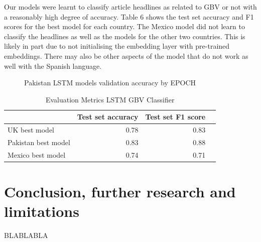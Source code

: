 \documentclass{article}
\begin{document}
{{Our models were learnt to classify article headlines as related to GBV or not with a reasonably high degree of accuracy. Table 6 shows the test set accuracy and F1 scores for the best model for each country. The Mexico model did not learn to classify the headlines as well as the models for the other two countries. This is likely in part due to not initialising the embedding layer with pre-trained embeddings. There may also be other aspects of the model that do not work as well with the Spanish language.


\begin{figure}[H]
	\caption{\label{fig:my-label1} Pakistan LSTM models validation accuracy by EPOCH}
\end{figure}

}
\begin{table}[!htp]\centering
	\caption{Evaluation Metrics LSTM GBV Classifier}\label{tab: }
	\scriptsize
	\begin{tabular}{lrrr}\toprule
		&Test set accuracy &Test set F1 score \\\midrule
		UK best model &0.78 &0.83 \\
		Pakistan best model &0.83 &0.88 \\
		Mexico best model &0.74 &0.71 \\
		\bottomrule
	\end{tabular}
\end{table}
	
}
\newpage
\section{Conclusion, further research and limitations}{
BLABLABLA
}

\newpage
\raggedbottom
\end{document}
